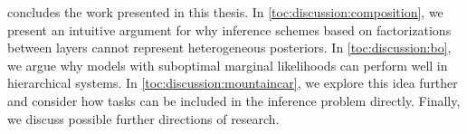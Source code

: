  concludes the work presented in this thesis.
In \cref{toc:discussion:composition}, we present an intuitive argument for why inference schemes based on factorizations between layers cannot represent heterogeneous posteriors.
In \cref{toc:discussion:bo}, we argue why models with suboptimal marginal likelihoods can perform well in hierarchical systems.
In \cref{toc:discussion:mountaincar}, we explore this idea further and consider how tasks can be included in the inference problem directly.
Finally, we discuss possible further directions of research.
